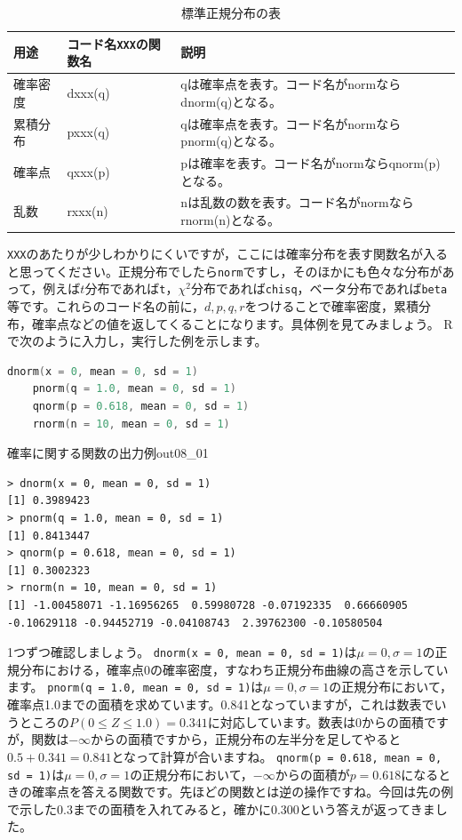 \documentclass{ltjbook}
\begin{document}
\begin{table}[ht]
    \caption{標準正規分布の表}
    \centering
    \begin{tabular}{lll}
        用途 & コード名\texttt{XXX}の関数名 & 説明 \\\hline
        確率密度 & dxxx(q) & qは確率点を表す。コード名がnormならdnorm(q)となる。 \\
        累積分布 & pxxx(q) & qは確率点を表す。コード名がnormならpnorm(q)となる。 \\
        確率点 & qxxx(p) & pは確率を表す。コード名がnormならqnorm(p)となる。 \\
        乱数 & rxxx(n) & nは乱数の数を表す。コード名がnormならrnorm(n)となる。 \\\hline
    \end{tabular}
    \label{tbl::08_02}
\end{table}

\texttt{XXX}のあたりが少しわかりにくいですが，ここには確率分布を表す関数名が入ると思ってください。正規分布でしたら\texttt{norm}ですし，そのほかにも色々な分布があって，例えば$t$分布であれば\texttt{t}，$\chi^2$分布であれば\texttt{chisq}，ベータ分布であれば\texttt{beta}等です。これらのコード名の前に，$d,p,q,r$をつけることで確率密度，累積分布，確率点などの値を返してくることになります。具体例を見てみましょう。
Rで次のように入力し，実行した例を示します。

\begin{lstlisting}[language=c++,label={code::08_01},caption={確率に関する関数使用例}]
    dnorm(x = 0, mean = 0, sd = 1)
    pnorm(q = 1.0, mean = 0, sd = 1)
    qnorm(p = 0.618, mean = 0, sd = 1)
    rnorm(n = 10, mean = 0, sd = 1)
\end{lstlisting}

\begin{Rscreen}{確率に関する関数の出力例}{out08_01}
	\begin{verbatim}
> dnorm(x = 0, mean = 0, sd = 1)
[1] 0.3989423
> pnorm(q = 1.0, mean = 0, sd = 1)
[1] 0.8413447
> qnorm(p = 0.618, mean = 0, sd = 1)
[1] 0.3002323
> rnorm(n = 10, mean = 0, sd = 1)
[1] -1.00458071 -1.16956265  0.59980728 -0.07192335  0.66660905 -0.10629118 -0.94452719 -0.04108743  2.39762300 -0.10580504
\end{verbatim}
\end{Rscreen}

1つずつ確認しましょう。
\texttt{dnorm(x = 0, mean = 0, sd = 1)}は$\mu=0,\sigma=1$の正規分布における，確率点0の確率密度，すなわち正規分布曲線の高さを示しています。
\texttt{pnorm(q = 1.0, mean = 0, sd = 1)}は$\mu=0,\sigma=1$の正規分布において，確率点1.0までの面積を求めています。0.841となっていますが，これは数表でいうところの$P(0\le Z \le 1.0)=0.341$に対応しています。数表は0からの面積ですが，関数は$-\infty$からの面積ですから，正規分布の左半分を足してやると$0.5+0.341=0.841$となって計算が合いますね。
\texttt{qnorm(p = 0.618, mean = 0, sd = 1)}は$\mu=0,\sigma=1$の正規分布において，$-\infty$からの面積が$p=0.618$になるときの確率点を答える関数です。先ほどの関数とは逆の操作ですね。今回は先の例で示した0.3までの面積を入れてみると，確かに0.300という答えが返ってきました。
\end{document}
